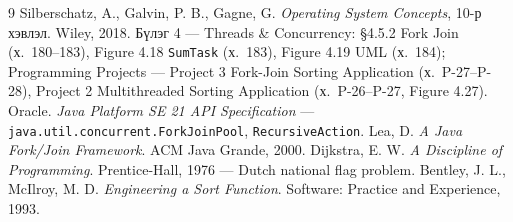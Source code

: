 \documentclass[11pt,a4paper]{article}
\begin{document}
\begin{thebibliography}{9}
 Silberschatz, A., Galvin, P. B., Gagne, G.
  \emph{Operating System Concepts}, 10-р хэвлэл. Wiley, 2018.
  Бүлэг 4 --- Threads \& Concurrency: \S4.5.2 Fork Join (х.~180--183),
  Figure 4.18 \texttt{SumTask} (х.~183), Figure 4.19 UML (х.~184);
  Programming Projects --- Project 3 Fork-Join Sorting Application
  (х.~P-27--P-28), Project 2 Multithreaded Sorting Application
  (х.~P-26--P-27, Figure 4.27).
 Oracle. \emph{Java Platform SE 21 API Specification} ---
  \texttt{java.util.concurrent.ForkJoinPool}, \texttt{RecursiveAction}.
 Lea, D. \emph{A Java Fork/Join Framework}. ACM Java Grande, 2000.
 Dijkstra, E. W. \emph{A Discipline of Programming}.
  Prentice-Hall, 1976 --- Dutch national flag problem.
 Bentley, J. L., McIlroy, M. D.
  \emph{Engineering a Sort Function}. Software: Practice and Experience, 1993.
\end{thebibliography}
\end{document}
